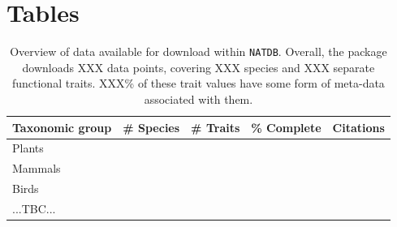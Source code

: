 \documentclass[12pt]{report}
\newcommand{\natdb}{\texttt{NATDB}\xspace}
\begin{document}
\section*{Tables}
\begin{table}[h!]
  \begin{tabular}{lllll}
    Taxonomic group & \# Species & \# Traits & \% Complete & Citations \\ \hline
    Plants & & & \textcite{Wright2004}\\
    Mammals & & & \textcite{Jones2009,Wilman2014}\\
    Birds & & & \textcite{Wilman2014}\\
    ...TBC... \\ \hline
  \end{tabular}
  \caption{Overview of data available for download within
    \natdb. Overall, the package downloads XXX data points, covering
    XXX species and XXX separate functional traits. XXX\% of these
    trait values have some form of meta-data associated with them.}
  \label{overview}
\end{table}
\end{document}
